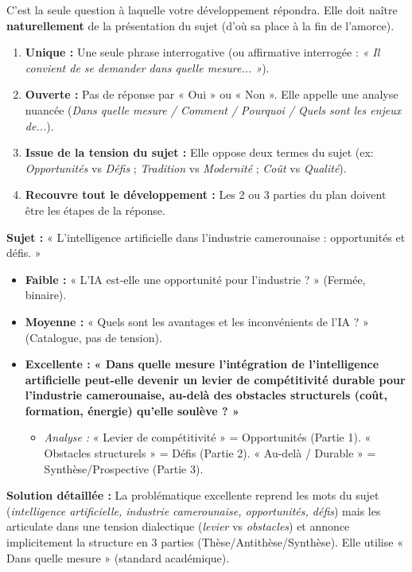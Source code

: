 \documentclass[11pt]{article}
\newcommand{\cle}[1]{{\popxbold\color{popdark}#1}}
\begin{document}
C'est la \cle{seule question} à laquelle votre développement répondra. Elle doit naître \textbf{naturellement} de la présentation du sujet (d'où sa place à la fin de l'amorce).

\begin{propriete}
\begin{enumerate}
    \item \textbf{Unique :} Une seule phrase interrogative (ou affirmative interrogée : \textit{« Il convient de se demander dans quelle mesure... »}).
    \item \textbf{Ouverte :} Pas de réponse par « Oui » ou « Non ». Elle appelle une analyse nuancée (\textit{Dans quelle mesure / Comment / Pourquoi / Quels sont les enjeux de...}).
    \item \textbf{Issue de la tension du sujet :} Elle oppose deux termes du sujet (ex: \textit{Opportunités} vs \textit{Défis} ; \textit{Tradition} vs \textit{Modernité} ; \textit{Coût} vs \textit{Qualité}).
    \item \textbf{Recouvre tout le développement :} Les 2 ou 3 parties du plan doivent être les étapes de la réponse.
\end{enumerate}
\end{propriete}

\begin{exoresolu}
\textbf{Sujet :} « L'intelligence artificielle dans l'industrie camerounaise : opportunités et défis. »

\begin{itemize}
    \item \textbf{Faible :} « L'IA est-elle une opportunité pour l'industrie ? » (Fermée, binaire).
    \item \textbf{Moyenne :} « Quels sont les avantages et les inconvénients de l'IA ? » (Catalogue, pas de tension).
    \item \textbf{Excellente :} \textbf{« Dans quelle mesure l'intégration de l'intelligence artificielle peut-elle devenir un levier de compétitivité durable pour l'industrie camerounaise, au-delà des obstacles structurels (coût, formation, énergie) qu'elle soulève ? »}
    \begin{itemize}
        \item \textit{Analyse :} « Levier de compétitivité » = Opportunités (Partie 1). « Obstacles structurels » = Défis (Partie 2). « Au-delà / Durable » = Synthèse/Prospective (Partie 3).
    \end{itemize}
\end{itemize}
\tcblower
\textbf{Solution détaillée :} La problématique excellente reprend les mots du sujet (\textit{intelligence artificielle, industrie camerounaise, opportunités, défis}) mais les articulate dans une tension dialectique (\textit{levier} vs \textit{obstacles}) et annonce implicitement la structure en 3 parties (Thèse/Antithèse/Synthèse). Elle utilise « Dans quelle mesure » (standard académique).
\end{exoresolu}
\end{document}

